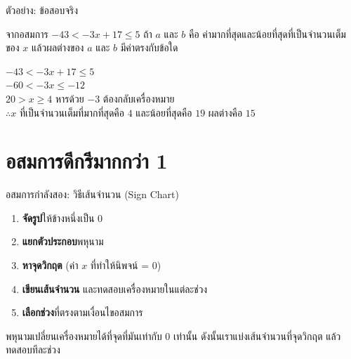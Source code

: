 \documentclass[11pt, aspectratio=169]{beamer}
\begin{document}
\begin{frame}{ตัวอย่าง: ข้อสอบจริง}
  \begin{exambox}[ข้อสอบปี 67 ข้อ 7]
    จากอสมการ $-43<-3x+17 \leq 5$ ถ้า $a$ และ $b$ คือ ค่ามากที่สุดและน้อยที่สุดที่เป็นจำนวนเต็มของ $x$ แล้วผลต่างของ $a$ และ $b$ มีค่าตรงกับข้อใด
  \end{exambox}

  \begin{solbox}
      $-43<-3x+17 \leq 5$\\
      $-60<-3x \leq -12$\\
      $20> x \geq 4$ หารด้วย $-3$ ต้องกลับเครื่องหมาย\\
      $\therefore x$ ที่เป็นจำนวนเต็มที่มากที่สุดคือ $4$ และน้อยที่สุดคือ $19$ ผลต่างคือ $15$ 
  \end{solbox}
\end{frame}

\section{อสมการดีกรีมากกว่า 1}

\begin{frame}{อสมการกำลังสอง: วิธีเส้นจำนวน (Sign Chart)}
  \begin{explanation}
    \begin{enumerate}
      \item \textbf{จัดรูป}ให้ข้างหนึ่งเป็น 0
      \item \textbf{แยกตัวประกอบ}พหุนาม
      \item \textbf{หาจุดวิกฤต} (ค่า $x$ ที่ทำให้นิพจน์ = 0)
      \item \textbf{เขียนเส้นจำนวน} และทดสอบเครื่องหมายในแต่ละช่วง
      \item \textbf{เลือกช่วง}ที่ตรงตามเงื่อนไขอสมการ
    \end{enumerate}
  \end{explanation}

  \begin{intuition}[แนวคิด]
    พหุนามเปลี่ยนเครื่องหมายได้ที่จุดที่มันเท่ากับ 0 เท่านั้น
    ดังนั้นเราแบ่งเส้นจำนวนที่จุดวิกฤต แล้วทดสอบทีละช่วง
  \end{intuition}
\end{frame}
\end{document}
